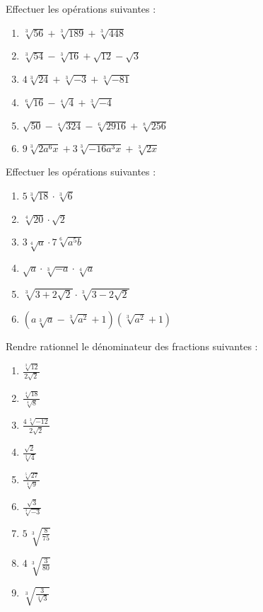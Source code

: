\begin{exercice}
Effectuer les opérations suivantes :
\begin{multicols}{2}
\begin{enumerate}
\item $\sqrt[3]{56}+\sqrt[3]{189}+\sqrt[3]{448}$
\item $\sqrt[3]{54}-\sqrt[3]{16}+\sqrt{12}-\sqrt{3}$
\item $4\sqrt[3]{24}+\sqrt[3]{-3}+\sqrt[3]{-81}$ 
\item $\sqrt[6]{16}-\sqrt[4]{4}+\sqrt[3]{-4}$
\item $\sqrt{50}-\sqrt[4]{324}-\sqrt[6]{2916}+\sqrt[8]{256}$
\item $9\sqrt[3]{2{{a}^{6}}x}+3\sqrt[3]{-16{{a}^{3}}x}+\sqrt[3]{2x}$
\end{enumerate}
\end{multicols}
\end{exercice}

\begin{exercice}
Effectuer les opérations suivantes :
\begin{multicols}{2}
\begin{enumerate}
\item $5\sqrt[3]{18}\cdot \sqrt[3]{6}$
\item $\sqrt[4]{20}\cdot \sqrt{2}$ 
\item $3\sqrt[4]{a}\cdot 7\sqrt[6]{{{a}^{5}}b}$
\item $\sqrt{a}\cdot \sqrt[3]{-a}\cdot \sqrt[4]{a}$
\item $\sqrt[3]{3+2\sqrt{2}}\cdot \sqrt[3]{3-2\sqrt{2}}$
\item $\left( a\sqrt[3]{a}-\sqrt[3]{{{a}^{2}}}+1 \right)\left( \sqrt[3]{{{a}^{2}}}+1 \right)$
\end{enumerate}
\end{multicols}
\end{exercice}

\begin{exercice}
Rendre rationnel le dénominateur des fractions suivantes :
\begin{multicols}{3}
\begin{enumerate}
\item $\frac{\sqrt[3]{12}}{2\sqrt{2}}$
\item $\frac{\sqrt[4]{18}}{\sqrt[4]{8}}$
\item $\frac{4\,\sqrt[3]{-12}}{2\sqrt{2}}$ 
\item $\frac{\sqrt{2}}{\sqrt[3]{4}}$
\item $\frac{\sqrt[5]{27}}{\sqrt[4]{9}}$
\item $\frac{\sqrt{3}}{\sqrt[3]{-3}}$
\item $5\,\sqrt[3]{\frac{8}{75}}$
\item $4\,\sqrt[3]{\frac{3}{80}}$
\item $\sqrt[3]{\frac{3}{\sqrt[4]{3}}}$
\end{enumerate}
\end{multicols}
\end{exercice}